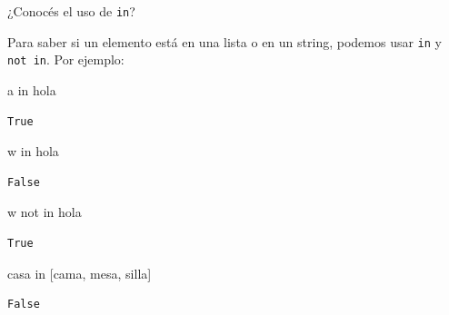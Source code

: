 \documentclass[
  letterpaper,
  DIV=11,
  numbers=noendperiod]{scrreprt}
\newenvironment{Shaded}{\begin{snugshade}}{\end{snugshade}}
\newcommand{\CommentTok}[1]{\textcolor[rgb]{0.37,0.37,0.37}{#1}}
\newcommand{\KeywordTok}[1]{\textcolor[rgb]{0.00,0.23,0.31}{#1}}
\newcommand{\NormalTok}[1]{\textcolor[rgb]{0.00,0.23,0.31}{#1}}
\newcommand{\StringTok}[1]{\textcolor[rgb]{0.13,0.47,0.30}{#1}}
\begin{document}
\begin{tcolorbox}[enhanced jigsaw, bottomrule=.15mm, leftrule=.75mm, opacityback=0, colback=white, toprule=.15mm, bottomtitle=1mm, opacitybacktitle=0.6, rightrule=.15mm, left=2mm, arc=.35mm, coltitle=black, title=\textcolor{quarto-callout-tip-color}{\faLightbulb}\hspace{0.5em}{Tip: \texttt{in} y \texttt{not\ in}}, breakable, toptitle=1mm, colframe=quarto-callout-tip-color-frame, titlerule=0mm, colbacktitle=quarto-callout-tip-color!10!white]

¿Conocés el uso de \texttt{in}?

Para saber si un elemento está en una lista o en un string, podemos usar
\texttt{in} y \texttt{not\ in}. Por ejemplo:

\begin{Shaded}
\begin{Highlighting}[]
\CommentTok{\textquotesingle{}a\textquotesingle{}} \KeywordTok{in} \StringTok{\textquotesingle{}hola\textquotesingle{}}
\end{Highlighting}
\end{Shaded}

\begin{verbatim}
True
\end{verbatim}

\begin{Shaded}
\begin{Highlighting}[]
\CommentTok{\textquotesingle{}w\textquotesingle{}} \KeywordTok{in} \StringTok{\textquotesingle{}hola\textquotesingle{}}
\end{Highlighting}
\end{Shaded}

\begin{verbatim}
False
\end{verbatim}

\begin{Shaded}
\begin{Highlighting}[]
\CommentTok{\textquotesingle{}w\textquotesingle{}} \KeywordTok{not} \KeywordTok{in} \StringTok{\textquotesingle{}hola\textquotesingle{}}
\end{Highlighting}
\end{Shaded}

\begin{verbatim}
True
\end{verbatim}

\begin{Shaded}
\begin{Highlighting}[]
\CommentTok{\textquotesingle{}casa\textquotesingle{}} \KeywordTok{in}\NormalTok{ [}\StringTok{\textquotesingle{}cama\textquotesingle{}}\NormalTok{, }\StringTok{\textquotesingle{}mesa\textquotesingle{}}\NormalTok{, }\StringTok{\textquotesingle{}silla\textquotesingle{}}\NormalTok{]}
\end{Highlighting}
\end{Shaded}

\begin{verbatim}
False
\end{verbatim}

\end{tcolorbox}
\end{document}
